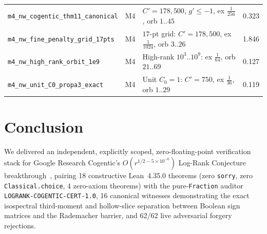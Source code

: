 \documentclass[10pt,twocolumn]{article}
\begin{document}
\begin{table}[t]
{\begin{tabular}{@{}l c l r@{}}
\texttt{m4\_nw\_cogentic\_thm11\_canonical} & M4 & $C'{=}178{,}500$, $g'\le -1$, ex $\frac{1}{256}$, orb $1..45$ & 0.323 \\
\texttt{m4\_nw\_fine\_penalty\_grid\_17pts} & M4 & $17$-pt grid: $C'{=}178{,}500$, ex $\frac{1}{1024}$, orb $3..26$ & 1.846 \\
\texttt{m4\_nw\_high\_rank\_orbit\_1e9} & M4 & High-rank $10^3..10^9$: ex $\frac{1}{64}$, orb $21..69$ & 0.127 \\
\texttt{m4\_nw\_unit\_C0\_propa3\_exact} & M4 & Unit $C_0{=}1$: $C'{=}750$, ex $\frac{1}{36}$, orb $1..29$ & 0.119 \\
\bottomrule
\end{tabular}}
\end{table}

\section{Conclusion}\label{sec:conc}
We delivered an independent, explicitly scoped, zero-floating-point verification stack for Google Research Cogentic's $O(r^{1/2-5\times 10^{-6}})$ Log-Rank Conjecture breakthrough~\cite{cogentic2026logrank}, pairing 18 constructive Lean~4.35.0 theorems (zero \texttt{sorry}, zero \texttt{Classical.choice}, 4 zero-axiom theorems) with the pure-\texttt{Fraction} auditor \nolinkurl{LOGRANK-COGENTIC-CERT-1.0}, 16 canonical witnesses demonstrating the exact isospectral third-moment and hollow-slice separation between Boolean sign matrices and the Rademacher barrier, and 62/62 live adversarial forgery rejections.



\end{document}
